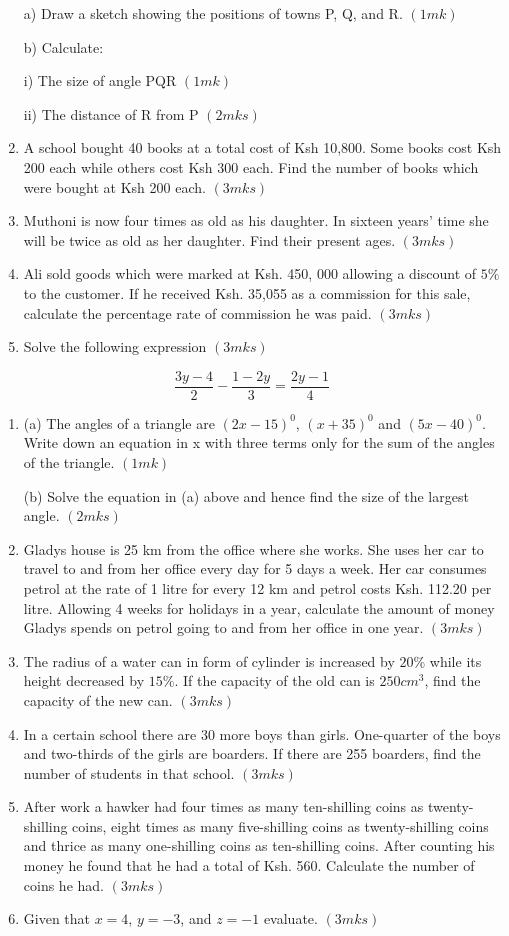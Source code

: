 \documentclass[
  a4paperpaper,
]{scrbook}
\begin{document}
\begin{tcolorbox}
\begin{enumerate}
  a) Draw a sketch showing the positions of towns P, Q, and R. \((1mk)\)

  b) Calculate:

  i) The size of angle PQR \((1mk)\)

  ii) The distance of R from P \((2mks)\)
\item
  A school bought 40 books at a total cost of Ksh 10,800. Some books
  cost Ksh 200 each while others cost Ksh 300 each. Find the number of
  books which were bought at Ksh 200 each. \((3mks)\)
\item
  Muthoni is now four times as old as his daughter. In sixteen years'
  time she will be twice as old as her daughter. Find their present
  ages. \((3mks)\)
\item
  Ali sold goods which were marked at Ksh. 450, 000 allowing a discount
  of \(5\%\) to the customer. If he received Ksh. 35,055 as a commission
  for this sale, calculate the percentage rate of commission he was
  paid. \((3mks)\)
\item
  Solve the following expression \((3mks)\)
\end{enumerate}

\[\frac{3y-4}{2}-\frac{1-2y}{3}=\frac{2y-1}{4}\]

\begin{enumerate}
\def\labelenumi{\arabic{enumi}.}
\setcounter{enumi}{10}
\item
  (a) The angles of a triangle are \((2x-15)^0\), \((x+35)^0\) and
  \((5x-40)^0\). Write down an equation in x with three terms only for
  the sum of the angles of the triangle. \((1mk)\)

  (b) Solve the equation in (a) above and hence find the size of the
  largest angle. \((2mks)\)
\item
  Gladys house is 25 km from the office where she works. She uses her
  car to travel to and from her office every day for 5 days a week. Her
  car consumes petrol at the rate of 1 litre for every 12 km and petrol
  costs Ksh. 112.20 per litre. Allowing 4 weeks for holidays in a year,
  calculate the amount of money Gladys spends on petrol going to and
  from her office in one year. \((3mks)\)
\item
  The radius of a water can in form of cylinder is increased by \(20\%\)
  while its height decreased by \(15\%\). If the capacity of the old can
  is \(250 cm^3\), find the capacity of the new can. \((3mks)\)
\item
  In a certain school there are 30 more boys than girls. One-quarter of
  the boys and two-thirds of the girls are boarders. If there are 255
  boarders, find the number of students in that school. \((3mks)\)
\item
  After work a hawker had four times as many ten-shilling coins as
  twenty-shilling coins, eight times as many five-shilling coins as
  twenty-shilling coins and thrice as many one-shilling coins as
  ten-shilling coins. After counting his money he found that he had a
  total of Ksh. 560. Calculate the number of coins he had. \((3mks)\)
\item
  Given that \(x=4\), \(y= -3\), and \(z= -1\) evaluate. \((3mks)\)
\end{enumerate}


\end{tcolorbox}
\end{document}
